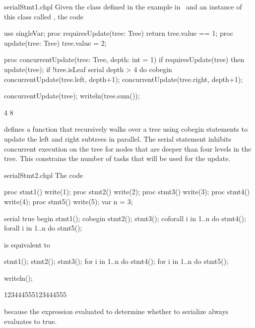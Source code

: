 \begin{chapelexample}{serialStmt1.chpl}
Given the  class defined in the example
in~ and an instance of this class
called , the code
\begin{chapelpre}
use singleVar;
proc requiresUpdate(tree: Tree) {
  return tree.value == 1;
}
proc update(tree: Tree) {
  tree.value = 2;
}
\end{chapelpre}
\begin{chapel}
proc concurrentUpdate(tree: Tree, depth: int = 1) {
  if requiresUpdate(tree) then
    update(tree);
  if !tree.isLeaf {
    serial depth > 4 do cobegin {
      concurrentUpdate(tree.left, depth+1);
      concurrentUpdate(tree.right, depth+1);
    }
  }
}
\end{chapel}
\begin{chapelpost}
concurrentUpdate(tree);
writeln(tree.sum());
\end{chapelpost}
\begin{chapeloutput}
4
8
\end{chapeloutput}
defines a function  that recursively walks over
a tree using cobegin statements to update the left and right subtrees
in parallel.  The serial statement inhibits concurrent execution on
the tree for nodes that are deeper than four levels in the tree.  This
constrains the number of tasks that will be used for the update.
\end{chapelexample}

\begin{chapelexample}{serialStmt2.chpl}
The code
\begin{chapelpre}
proc stmt1() { write(1); }
proc stmt2() { write(2); }
proc stmt3() { write(3); }
proc stmt4() { write(4); }
proc stmt5() { write(5); }
var n = 3;
\end{chapelpre}
\begin{chapel}
serial true {
  begin stmt1();
  cobegin {
    stmt2();
    stmt3();
  }
  coforall i in 1..n do stmt4();
  forall i in 1..n do stmt5();
}
\end{chapel}
is equivalent to
\begin{chapel}
stmt1();
{
  stmt2();
  stmt3();
}
for i in 1..n do stmt4();
for i in 1..n do stmt5();
\end{chapel}
\begin{chapelpost}
writeln();
\end{chapelpost}
\begin{chapeloutput}
123444555123444555
\end{chapeloutput}
because the expression evaluated to determine whether to serialize
always evaluates to true.
\end{chapelexample}

